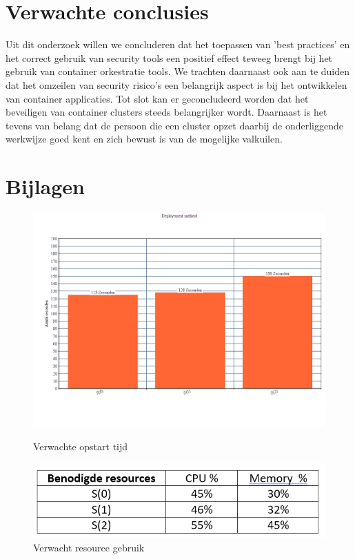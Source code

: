 \section{Verwachte conclusies}
\label{sec:verwachte_conclusies}

Uit dit onderzoek willen we concluderen dat het toepassen van 'best practices' en het correct gebruik van security tools een positief effect teweeg brengt bij het gebruik van container orkestratie tools. 
We trachten daarnaast ook aan te duiden dat het omzeilen van security risico's een belangrijk aspect is bij het ontwikkelen van container applicaties. 
Tot slot kan er geconcludeerd worden dat het beveiligen van container clusters steeds belangrijker wordt. 
Daarnaast is het tevens van belang dat de persoon die een cluster opzet daarbij de onderliggende werkwijze goed kent en zich bewust is van de mogelijke valkuilen. 

\section{Bijlagen}
\label{sec:Bijlagen}
\begin{figure}[ht]
	\centering
	\includegraphics[width=\linewidth]{img/Mock1.png}
	\caption{Verwachte opstart tijd}
	\label{fig:example}
	\includegraphics[width=\linewidth]{img/Mock2.png}
	\caption{Verwacht resource gebruik}
  \label{fig:example}
\end{figure}
